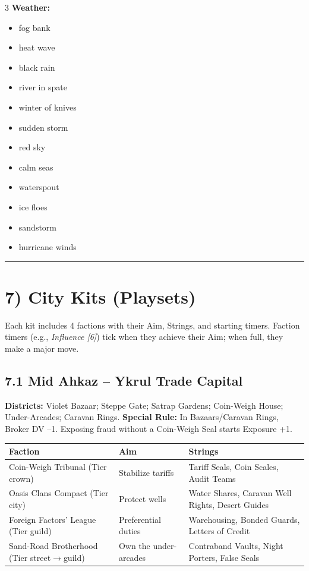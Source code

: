 \documentclass[11pt]{article}
\newcommand{\sectionrule}{\vspace{0.5em}\noindent\textcolor{gray}{\rule{\textwidth}{0.4pt}}\par\vspace{0.5em}}
\begin{document}
\begin{multicols}{3}
\textbf{Weather:}
\begin{itemize}
    \item fog bank
    \item heat wave
    \item black rain
    \item river in spate
    \item winter of knives
    \item sudden storm
    \item red sky
    \item calm seas
    \item waterspout
    \item ice floes
    \item sandstorm
    \item hurricane winds
\end{itemize}
\end{multicols}

\sectionrule

\section*{7) City Kits (Playsets)}
Each kit includes 4 factions with their Aim, Strings, and starting timers.  
Faction timers (e.g., \textit{Influence [6]}) tick when they achieve their Aim; when full, they make a major move.

\subsection*{7.1 Mid Ahkaz -- Ykrul Trade Capital}
\textbf{Districts:} Violet Bazaar; Steppe Gate; Satrap Gardens; Coin-Weigh House; Under-Arcades; Caravan Rings.  
\textbf{Special Rule:} In Bazaars/Caravan Rings, Broker DV --1. Exposing fraud without a Coin-Weigh Seal starts Exposure +1.

\begin{tabular}{@{}p{3cm}p{3.5cm}p{3.5cm}@{}}
\toprule
Faction & Aim & Strings \\
\midrule
Coin-Weigh Tribunal (Tier crown) & Stabilize tariffs & Tariff Seals, Coin Scales, Audit Teams \\
Oasis Clans Compact (Tier city) & Protect wells & Water Shares, Caravan Well Rights, Desert Guides \\
Foreign Factors' League (Tier guild) & Preferential duties & Warehousing, Bonded Guards, Letters of Credit \\
Sand-Road Brotherhood (Tier street$\rightarrow$guild) & Own the under-arcades & Contraband Vaults, Night Porters, False Seals \\
\bottomrule
\end{tabular}
\end{document}
